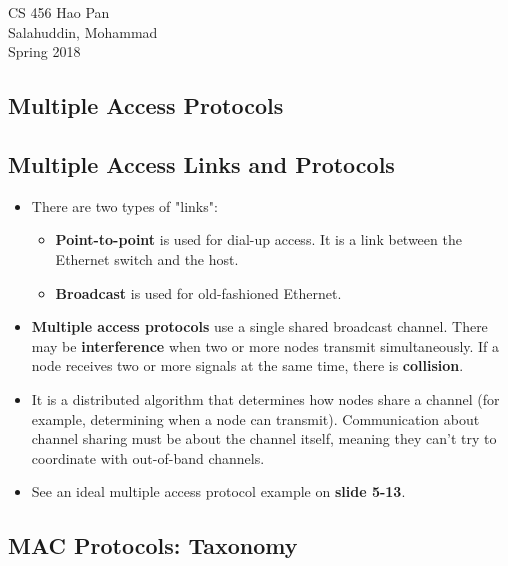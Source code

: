 \documentclass{article}
\begin{document}
\noindent
{CS 456 \hfill Hao Pan}\\
{Salahuddin, Mohammad}\\
{Spring 2018}


\begin{center}
\section{Multiple Access Protocols}
\noindent
\end{center}

\subsection{Multiple Access Links and Protocols}

\begin{itemize}
\item There are two types of "links":
\begin{itemize}
\item {\bf Point-to-point} is used for dial-up access. It is a link between the Ethernet switch and the host.
\item {\bf Broadcast} is used for old-fashioned Ethernet.
\end{itemize}
\item {\bf Multiple access protocols} use a single shared broadcast channel. There may be {\bf interference} when two or more nodes transmit simultaneously. If a node receives two or more signals at the same time, there is {\bf collision}.
\item It is a distributed algorithm that determines how nodes share a channel (for example, determining when a node can transmit). Communication about channel sharing must be about the channel itself, meaning they can't try to coordinate with out-of-band channels.
\item See an ideal multiple access protocol example on {\bf slide 5-13}.
\end{itemize}

\subsection{MAC Protocols: Taxonomy}
\end{document}
